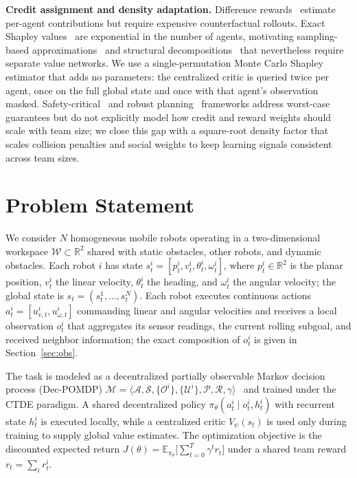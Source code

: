 \documentclass[journal,twoside,web]{ieeecolor}
\begin{document}
\textbf{Credit assignment and density adaptation.} Difference rewards~\cite{wolpert2002optimal} estimate per-agent contributions but require expensive counterfactual rollouts. Exact Shapley values~\cite{shapley1953value} are exponential in the number of agents, motivating sampling-based approximations~\cite{wang2020shapley} and structural decompositions~\cite{chang2022shapley} that nevertheless require separate value networks. We use a single-permutation Monte Carlo Shapley estimator that adds no parameters: the centralized critic is queried twice per agent, once on the full global state and once with that agent's observation masked. Safety-critical~\cite{zhu2025safehj,dawood2025safecoop} and robust planning~\cite{riemens2026gpmpc} frameworks address worst-case guarantees but do not explicitly model how credit and reward weights should scale with team size; we close this gap with a square-root density factor that scales collision penalties and social weights to keep learning signals consistent across team sizes.

\section{Problem Statement}
\label{sec:problem_statement}

We consider $N$ homogeneous mobile robots operating in a two-dimensional workspace $\mathcal{W}\subset\mathbb{R}^2$ shared with static obstacles, other robots, and dynamic obstacles. Each robot $i$ has state $s_t^i=[p_t^i,v_t^i,\theta_t^i,\omega_t^i]$, where $p_t^i\in\mathbb{R}^2$ is the planar position, $v_t^i$ the linear velocity, $\theta_t^i$ the heading, and $\omega_t^i$ the angular velocity; the global state is $s_t=(s_t^1,\ldots,s_t^N)$. Each robot executes continuous actions $a_t^i=[u_{v,t}^i,u_{\omega,t}^i]$ commanding linear and angular velocities and receives a local observation $o_t^i$ that aggregates its sensor readings, the current rolling subgoal, and received neighbor information; the exact composition of $o_t^i$ is given in Section~\ref{sec:obs}.

The task is modeled as a decentralized partially observable Markov decision process (Dec-POMDP) $\mathcal{M}=\bigl\langle\mathcal{A},\mathcal{S},\{\mathcal{O}^i\},\{\mathcal{U}^i\},\mathcal{P},\mathcal{R},\gamma\bigr\rangle$~\cite{oliehoek2016concise,bernstein2002complexity} and trained under the CTDE paradigm. A shared decentralized policy $\pi_\theta(a_t^i\mid o_t^i,h_t^i)$ with recurrent state $h_t^i$ is executed locally, while a centralized critic $V_\psi(s_t)$ is used only during training to supply global value estimates. The optimization objective is the discounted expected return $J(\theta)=\mathbb{E}_{\pi_\theta}\!\bigl[\sum_{t=0}^{T}\gamma^t r_t\bigr]$ under a shared team reward $r_t=\sum_i r_t^i$.
\end{document}
